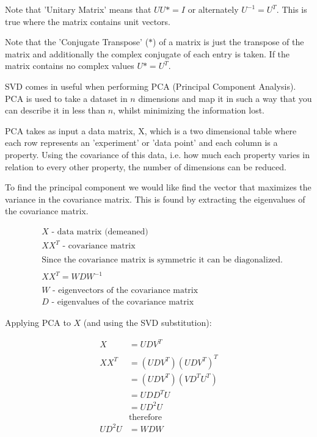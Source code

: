 Note that 'Unitary Matrix' means that $UU* = I$ or alternately $U^{-1} = U^T$. This is true where the matrix contains unit vectors.

Note that the 'Conjugate Transpose' ($*$) of a matrix is just the transpose of the matrix and additionally the complex conjugate of each entry is taken. If the matrix contains no complex values $U* = U^T$.

SVD comes in useful when performing PCA (Principal Component Analysis). PCA is used to take a dataset in $n$ dimensions and map it in such a way that you can describe it in less than $n$, whilst minimizing the information lost.

PCA takes as input a data matrix, X, which is a two dimensional table where each row represents an 'experiment' or 'data point' and each column is a property. Using the covariance of this data, i.e. how much each property varies in relation to every other property, the number of dimensions can be reduced.

To find the principal component we would like find the vector that maximizes the variance in the covariance matrix. This is found by extracting the eigenvalues of the covariance matrix.

\begin{align*}
& X \text{ - data matrix (demeaned)} \\
& XX^{T} \text{ - covariance matrix} \\
& \\
& \text{Since the covariance matrix is symmetric it can be diagonalized.} \\
& \\
& XX^{T} = WDW^{-1} \\
& \\
& W \text{ - eigenvectors of the covariance matrix} \\
& D \text{ - eigenvalues of the covariance matrix}
\end{align*}

Applying PCA to $X$ (and using the SVD substitution):

\begin{align*}
X &= UDV^T \\
& \\
XX^T &= (UDV^T)(UDV^T)^T \\
	&= (UDV^T)(VD^TU^T) \\
	&= UDD^TU \\
	&= UD^{2}U \\
	& \text{therefore} \\
UD^{2}U &= WDW
\end{align*}

